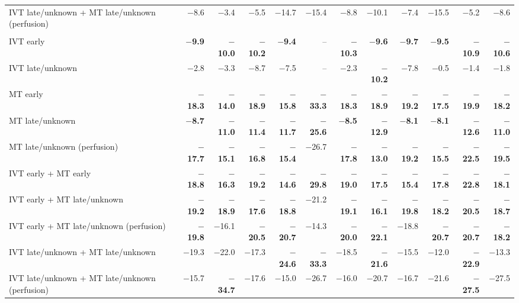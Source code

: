 \begin{landscape}
{\begin{longtable}{p{4.9cm}rrrrrrrrrrr}
IVT late/unknown + MT late/unknown (perfusion) & $-$8.6 & $-$3.4 & $-$5.5 & $-$14.7 & $-$15.4 & $-$8.8 & $-$10.1 & $-$7.4 & $-$15.5 & $-$5.2 & $-$8.6 \\
\addlinespace
\multicolumn{12}{l}{\textbf{NIHSS 21--25}}\\
IVT early & \textbf{$-$9.9} & \textbf{$-$10.0} & \textbf{$-$10.2} & \textbf{$-$9.4} & -- & \textbf{$-$10.3} & \textbf{$-$9.6} & \textbf{$-$9.7} & \textbf{$-$9.5} & \textbf{$-$10.9} & \textbf{$-$10.6} \\
IVT late/unknown & $-$2.8 & $-$3.3 & $-$8.7 & $-$7.5 & -- & $-$2.3 & \textbf{$-$10.2} & $-$7.8 & $-$0.5 & $-$1.4 & $-$1.8 \\
MT early & \textbf{$-$18.3} & \textbf{$-$14.0} & \textbf{$-$18.9} & \textbf{$-$15.8} & \textbf{$-$33.3} & \textbf{$-$18.3} & \textbf{$-$18.9} & \textbf{$-$19.2} & \textbf{$-$17.5} & \textbf{$-$19.9} & \textbf{$-$18.2} \\
MT late/unknown & \textbf{$-$8.7} & \textbf{$-$11.0} & \textbf{$-$11.4} & \textbf{$-$11.7} & \textbf{$-$25.6} & \textbf{$-$8.5} & \textbf{$-$12.9} & \textbf{$-$8.1} & \textbf{$-$8.1} & \textbf{$-$12.6} & \textbf{$-$11.0} \\
MT late/unknown (perfusion) & \textbf{$-$17.7} & \textbf{$-$15.1} & \textbf{$-$16.8} & \textbf{$-$15.4} & $-$26.7 & \textbf{$-$17.8} & \textbf{$-$13.0} & \textbf{$-$19.2} & \textbf{$-$15.5} & \textbf{$-$22.5} & \textbf{$-$19.5} \\
IVT early + MT early & \textbf{$-$18.8} & \textbf{$-$16.3} & \textbf{$-$19.2} & \textbf{$-$14.6} & \textbf{$-$29.8} & \textbf{$-$19.0} & \textbf{$-$17.5} & \textbf{$-$15.4} & \textbf{$-$17.8} & \textbf{$-$22.8} & \textbf{$-$18.1} \\
IVT early + MT late/unknown & \textbf{$-$19.2} & \textbf{$-$18.9} & \textbf{$-$17.6} & \textbf{$-$18.8} & $-$21.2 & \textbf{$-$19.1} & \textbf{$-$16.1} & \textbf{$-$19.8} & \textbf{$-$18.2} & \textbf{$-$20.5} & \textbf{$-$18.7} \\
IVT early + MT late/unknown (perfusion) & \textbf{$-$19.8} & $-$16.1 & \textbf{$-$20.5} & \textbf{$-$20.7} & $-$14.3 & \textbf{$-$20.0} & \textbf{$-$22.1} & $-$18.8 & \textbf{$-$20.7} & \textbf{$-$20.7} & \textbf{$-$18.2} \\
IVT late/unknown + MT late/unknown & $-$19.3 & $-$22.0 & $-$17.3 & \textbf{$-$24.6} & \textbf{$-$33.3} & $-$18.5 & \textbf{$-$21.6} & $-$15.5 & $-$12.0 & \textbf{$-$22.9} & $-$13.3 \\
IVT late/unknown + MT late/unknown (perfusion) & $-$15.7 & \textbf{$-$34.7} & $-$17.6 & $-$15.0 & $-$26.7 & $-$16.0 & $-$20.7 & $-$16.7 & $-$21.6 & \textbf{$-$27.5} & $-$27.5 \\

\end{longtable}}
\end{landscape}
